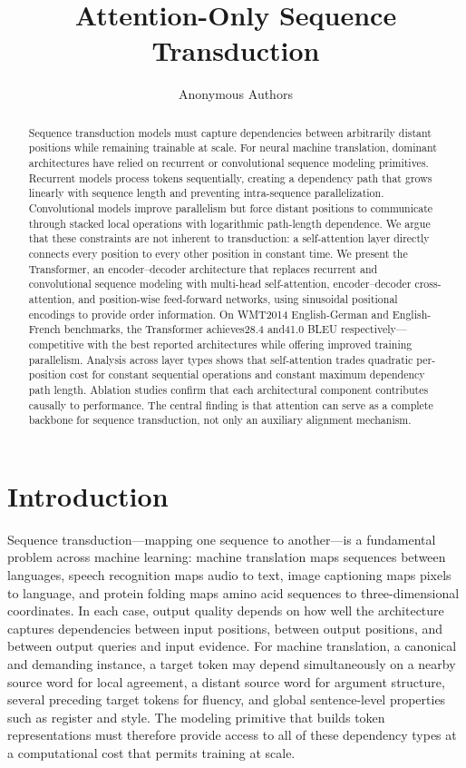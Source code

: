 ﻿\documentclass{article}
\title{Attention-Only Sequence Transduction}
\author{Anonymous Authors}
\begin{document}
\maketitle


\begin{abstract}
Sequence transduction models must capture dependencies between arbitrarily distant positions while remaining trainable at scale. For neural machine translation, dominant architectures have relied on recurrent or convolutional sequence modeling primitives. Recurrent models process tokens sequentially, creating a dependency path that grows linearly with sequence length and preventing intra-sequence parallelization. Convolutional models improve parallelism but force distant positions to communicate through stacked local operations with logarithmic path-length dependence. We argue that these constraints are not inherent to transduction: a self-attention layer directly connects every position to every other position in constant time. We present the Transformer, an encoder--decoder architecture that replaces recurrent and convolutional sequence modeling with multi-head self-attention, encoder--decoder cross-attention, and position-wise feed-forward networks, using sinusoidal positional encodings to provide order information. On WMT2014 English-German and English-French benchmarks, the Transformer achieves28.4 and41.0 BLEU respectively---competitive with the best reported architectures while offering improved training parallelism. Analysis across layer types shows that self-attention trades quadratic per-position cost for constant sequential operations and constant maximum dependency path length. Ablation studies confirm that each architectural component contributes causally to performance. The central finding is that attention can serve as a complete backbone for sequence transduction, not only an auxiliary alignment mechanism.
\end{abstract}

\section{Introduction}

Sequence transduction---mapping one sequence to another---is a fundamental problem across machine learning: machine translation maps sequences between languages, speech recognition maps audio to text, image captioning maps pixels to language, and protein folding maps amino acid sequences to three-dimensional coordinates. In each case, output quality depends on how well the architecture captures dependencies between input positions, between output positions, and between output queries and input evidence. For machine translation, a canonical and demanding instance, a target token may depend simultaneously on a nearby source word for local agreement, a distant source word for argument structure, several preceding target tokens for fluency, and global sentence-level properties such as register and style. The modeling primitive that builds token representations must therefore provide access to all of these dependency types at a computational cost that permits training at scale.
\end{document}
